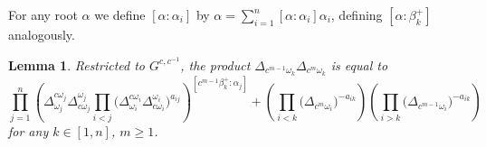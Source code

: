 \documentclass[11pt]{amsart}
\newtheorem{lemma}[theorem]{Lemma}
\numberwithin{equation}{section}
\begin{document}
For any root $\alpha$ we define $[\alpha:\alpha_i]$ by $\alpha = \sum_{i=1}^n [\alpha:\alpha_i]\alpha_i$, defining $[\alpha:\beta_k^+]$ analogously.

  \begin{lemma}\label{lem:minorsondbc}
    Restricted to $G^{c,c^{-1}}$, the product $\Delta_{c^{m-1}\omega_k}\Delta_{c^{m}\omega_k}$ is equal to
    \begin{equation} 
      \prod_{j=1}^n \left( \Delta^{c \omega_j}_{\omega_j}\Delta^{\omega_j}_{ c\omega_j} \prod_{i < j}\big(\Delta^{c \omega_i}_{\omega_i} \Delta^{\omega_i}_{c \omega_i}\big)^{a_{ij}}\right)^{[c^{m-1} \beta_k^+:\alpha_j]} + 
      \left(\prod_{i < k}\big(\Delta_{c^{m}\omega_i}\big)^{-a_{ik}}\right)\left(\prod_{i>k}\big(\Delta_{c^{m-1}\omega_i}\big)^{-a_{ik}}\right)
    \end{equation}
    for any $k \in [1,n]$, $m \geq 1$.  
  \end{lemma}
\end{document}
